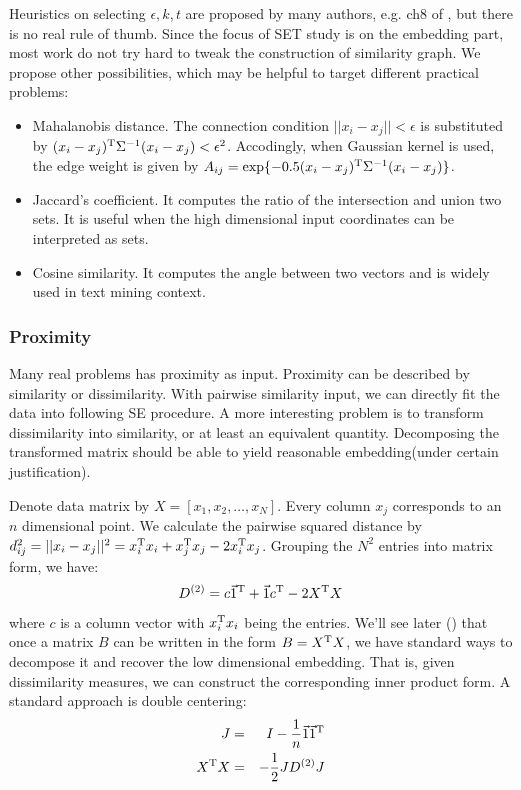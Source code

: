Heuristics on selecting $\epsilon, k, t$ are proposed by many authors, 
e.g. ch8 of \cite{von2007tutorial}, but there is no real 
rule of thumb. Since the focus of SET study is on the embedding part, 
most work do not try hard to tweak the construction of similarity graph. 
We propose other possibilities, which may be helpful to target 
different practical problems:
\begin{itemize}
	\item Mahalanobis distance\cite{wiki_md}. The connection condition 
		$||x_i-x_j|| < \epsilon$ is substituted by 
		$(x_i-x_j)^\mathrm{T}\Sigma^{-1}(x_i-x_j) < \epsilon^2$. 
		Accodingly, when Gaussian kernel is used, the edge weight
		is given by $A_{ij} = \exp\{-0.5(x_i-x_j)^\mathrm{T}\Sigma^{-1}(x_i-x_j)\}$. 
	\item Jaccard's coefficient\cite{wiki_jaccard}. It computes the ratio 
		of the intersection and union two sets. It is useful when 
		the high dimensional input coordinates can be interpreted as 
		sets. 
	\item Cosine similarity\cite{wiki_cos}. It computes the 
		angle between two vectors and is widely used in 
		text mining context. 
\end{itemize}


\subsubsection{Proximity}

Many real problems has proximity as input. Proximity 
can be described by similarity or dissimilarity. 
With pairwise similarity input, we can directly fit the 
data into following SE procedure. A more interesting 
problem is to transform dissimilarity into similarity, 
or at least an equivalent quantity. 
Decomposing the transformed matrix should be able to yield
reasonable embedding(under certain justification). 

Denote data matrix by $X = [x_1, x_2, \ldots, x_N]$. Every 
column $x_j$ corresponds to an $n$ dimensional point. We 
calculate the pairwise squared distance by 
$d^2_{ij} = ||x_i - x_j||^2 = x_i^\mathrm{T}x_i + x_j^\mathrm{T}x_j - 2x_i^\mathrm{T}x_j$. 
Grouping the $N^2$ entries into matrix form, we have:
\begin{equation}
	D^{(2)} = c\vec{1}^\mathrm{T} + \vec{1}c^\mathrm{T} - 2 X^\mathrm{T}X
\end{equation}
where $c$ is a column vector with $x_i^\mathrm{T}x_i$ being the entries. 
We'll see later (\rsec{\ref{sec:mds}}) that once a matrix $B$ can be 
written in the form $B = X^\mathrm{T}X$, we have standard ways to decompose
it and recover the low dimensional embedding. That is, given 
dissimilarity measures, we can construct the corresponding inner 
product form. A standard approach is double centering: \cite{borg2005modern}
\begin{eqnarray}
	J &=& I - \frac{1}{n} \vec{1} \vec{1}^\mathrm{T} \\
	X^\mathrm{T}X &=& -\frac{1}{2}JD^{(2)}J
\end{eqnarray}

